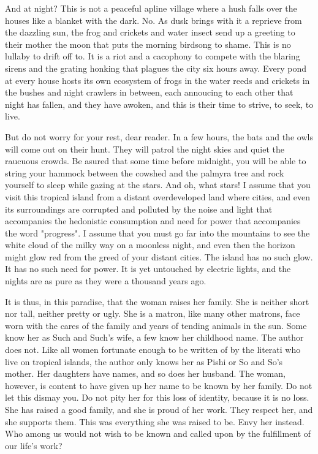 \documentclass{amsart}
\begin{document}
And at night? This is not a peaceful apline village where a hush falls over the houses like a blanket with the dark. No. As dusk brings with it a reprieve from the dazzling sun, the frog and crickets and water insect send up a greeting to their mother the moon that puts the morning birdsong to shame. This is no lullaby to drift off to. It is a riot and a cacophony to compete with the blaring sirens and the grating honking that plagues the city six hours away. Every pond at every house hosts its own ecosystem of frogs in the water reeds and crickets in the bushes and night crawlers in between, each annoucing to each other that night has fallen, and they have awoken, and this is their time to strive, to seek, to live.

But do not worry for your rest, dear reader. In a few hours, the bats and the owls will come out on their hunt. They will patrol the night skies and quiet the raucuous crowds. Be asured that some time before midnight, you will be able to string your hammock between the cowshed and the palmyra tree and rock yourself to sleep while gazing at the stars. And oh, what stars! I assume that you visit this tropical island from a distant overdeveloped land where cities, and even its surroundings are corrupted and polluted by the noise and light that accompanies the hedonistic consumption and need for power that accompanies the word "progress". I assume that you must go far into the mountains to see the white cloud of the milky way on a moonless night, and even then the horizon might glow red from the greed of your distant cities. The island has no such glow. It has no such need for power. It is yet untouched by electric lights, and the nights are as pure as they were a thousand years ago.

It is thus, in this paradise, that the woman raises her family. She is neither short nor tall, neither pretty or ugly. She is a matron, like many other matrons, face worn with the cares of the family and years of tending animals in the sun. Some know her as Such and Such's wife, a few know her childhood name. The author does not. Like all women fortunate enough to be written of by the literati who live on tropical islands, the author only knows her as Pishi or So and So's mother. Her daughters have names, and so does her husband. The woman, however, is content to have given up her name to be known by her family. Do not let this dismay you. Do not pity her for this loss of identity, because it is no loss. She has raised a good family, and she is proud of her work. They respect her, and she supports them. This was everything she was raised to be. Envy her instead. Who among us would not wish to be known and called upon by the fulfillment of our life's work? 
\end{document}
